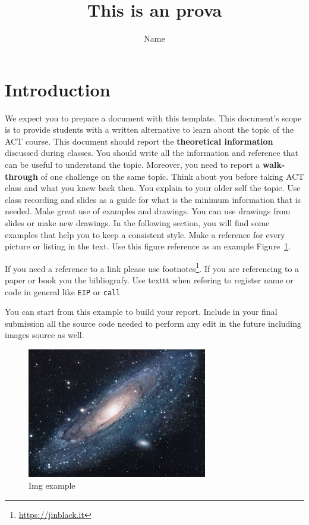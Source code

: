 \documentclass{article}
\author{Name}
\title{This is an prova}
\date{}
\begin{document}
\maketitle

\section{Introduction}

We expect you to prepare a document with this template. This document's scope is to provide students with a written alternative to learn about the topic of the ACT course.
This document should report the \textbf{theoretical information} discussed during classes. You should write all the information and reference that can be useful to understand the topic. Moreover, you need to report a \textbf{walk-through} of one challenge on the same topic.
Think about you before taking ACT class and what you knew back then. You explain to your older self the topic.
Use class recording and slides as a guide for what is the minimum information that is needed.
Make great use of examples and drawings. You can use drawings from slides or make new drawings.
In the following section, you will find some examples that help you to keep a consistent style.
Make a reference for every picture or listing in the text. Use this figure reference as an example Figure~\ref{fig:universe}. 

If you need a reference to a link please use footnotes\footnote{\url{https://jinblack.it}}. If you are referencing to a paper or book you the bibliografy.\citep{adams1995hitchhiker}
Use texttt when refering to register name or code in general like \texttt{EIP} or \texttt{call}

You can start from this example to build your report. Include in your final submission all the source code needed to perform any edit in the future including images source as well.

\begin{figure}[tbh]
\centering
\includegraphics[width=0.7\textwidth]{images/universe.jpg}
\caption{Img example}
\label{fig:universe}
\end{figure}
\end{document}
